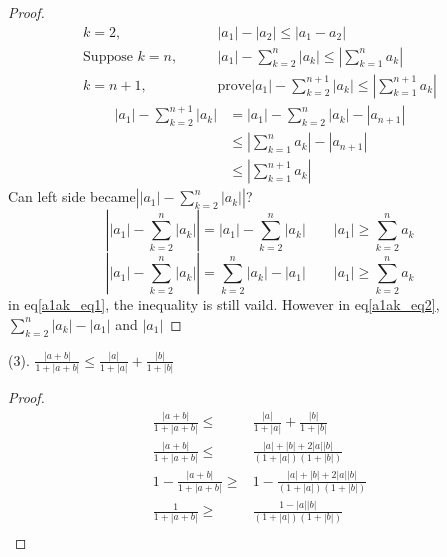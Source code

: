 \begin{example}
\begin{proof}
		\begin{align*}
			k=2,\qquad&|a_1| - |a_2| \le |a_1-a_2|\\
			\text{Suppose } k = n, \qquad & |a_1| - \sum_{k=2}^n |a_k| \le |\sum_{k=1}^n a_k| \\
			k = n+1, \qquad& \text{prove}|a_1| - \sum_{k=2}^{n+1} |a_k| \le |\sum_{k=1}^{n+1} a_k|
		\end{align*}
		\begin{align*}
			|a_1| - \sum_{k=2}^{n+1} |a_k| 
			&= |a_1| - \sum_{k=2}^{n} |a_k| - |a_{n+1}| \\
			&\le |\sum_{k=1}^n a_k| - |a_{n+1}| \\
			&\le |\sum_{k=1}^{n+1} a_k|
		\end{align*}
		Can left side became$ \left| |a_1| - \sum_{k=2}^n|a_k|\right| $?
		\begin{equation}\label{a1ak_eq1}
			\left| |a_1| - \sum_{k=2}^n|a_k|\right| = |a_1| - \sum_{k=2}^n|a_k| \qquad |a_1| \ge\sum_{k=2}^n a_k
		\end{equation}
		\begin{equation}\label{a1ak_eq2}
			\left| |a_1| - \sum_{k=2}^n|a_k|\right| = \sum_{k=2}^n|a_k| - |a_1| \qquad |a_1| \ge\sum_{k=2}^n a_k
		\end{equation}
		in eq\ref{a1ak_eq1}, the inequality is still vaild. However in eq\ref{a1ak_eq2}, $ \sum_{k=2}^n |a_k| - |a_1| $ and $ |a_1| $
	\end{proof}
	(3). $\frac{|a+b|}{1+|a+b|}\le \frac{|a|}{1+|a|} + \frac{|b|}{1+|b|} $
	\begin{proof}
	\begin{align*}
		\frac{|a+b|}{1+|a+b|}\le &\frac{|a|}{1+|a|} + \frac{|b|}{1+|b|}\\
		\frac{|a+b|}{1+|a+b|}\le &\frac{|a|+|b|+2|a||b|}{(1+|a|)(1+|b|)}\\
		1-\frac{|a+b|}{1+|a+b|}\ge &1-\frac{|a|+|b|+2|a||b|}{(1+|a|)(1+|b|)}\\
		\frac{1}{1+|a+b|}\ge &\frac{1-|a||b|}{(1+|a|)(1+|b|)}\\

\end{align*}
\end{proof}
\end{example}
